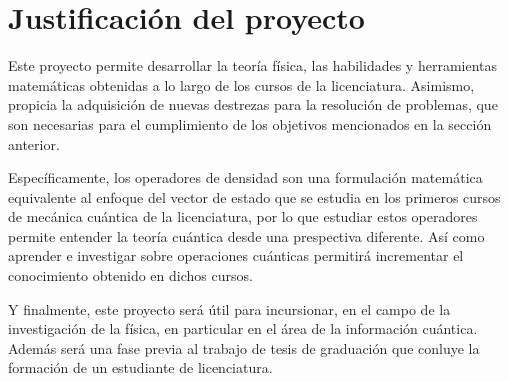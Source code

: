 \section{Justificación del proyecto}

	  Este proyecto permite desarrollar la teoría física, las habilidades y herramientas matemáticas obtenidas a lo largo de los cursos de la licenciatura. Asimismo, propicia la adquisición de nuevas destrezas para la resolución de problemas, que son necesarias para el cumplimiento de los objetivos mencionados en la sección anterior.


 
 
 Específicamente, los operadores de densidad son una formulación matemática equivalente al enfoque del vector de estado que se estudia en los primeros cursos de mecánica cuántica de la licenciatura, por lo que estudiar estos operadores permite entender la teoría cuántica desde una prespectiva diferente. Así como aprender e investigar sobre operaciones cuánticas permitirá incrementar el conocimiento obtenido en dichos cursos.
 

  
  
 Y finalmente, este proyecto será útil para incursionar, en el campo de la investigación de la física, en particular en el área de la información cuántica. Además será una fase previa al trabajo de tesis de graduación que conluye la formación de un estudiante de licenciatura.    
